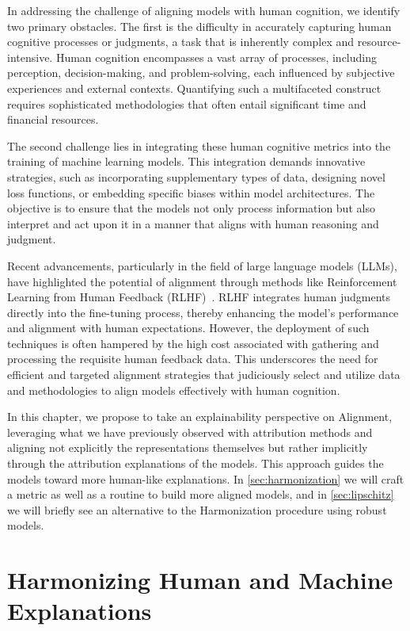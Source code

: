 In addressing the challenge of aligning models with human cognition, we identify two primary obstacles. The first is the difficulty in accurately capturing human cognitive processes or judgments, a task that is inherently complex and resource-intensive. Human cognition encompasses a vast array of processes, including perception, decision-making, and problem-solving, each influenced by subjective experiences and external contexts. Quantifying such a multifaceted construct requires sophisticated methodologies that often entail significant time and financial resources.

The second challenge lies in integrating these human cognitive metrics into the training of machine learning models. This integration demands innovative strategies, such as incorporating supplementary types of data, designing novel loss functions, or embedding specific biases within model architectures. The objective is to ensure that the models not only process information but also interpret and act upon it in a manner that aligns with human reasoning and judgment.

Recent advancements, particularly in the field of large language models (LLMs), have highlighted the potential of alignment through methods like Reinforcement Learning from Human Feedback (RLHF)~\cite{ouyang2022training}. RLHF integrates human judgments directly into the fine-tuning process, thereby enhancing the model's performance and alignment with human expectations. However, the deployment of such techniques is often hampered by the high cost associated with gathering and processing the requisite human feedback data. This underscores the need for efficient and targeted alignment strategies that judiciously select and utilize data and methodologies to align models effectively with human cognition.

In this chapter, we propose to take an explainability perspective on Alignment, leveraging what we have previously observed with attribution methods and aligning not explicitly the representations themselves but rather implicitly through the attribution explanations of the models. This approach guides the models toward more human-like explanations. In \autoref{sec:harmonization} we will craft a metric as well as a routine to build more aligned models, and in \autoref{sec:lipschitz} we will briefly see an alternative to the Harmonization procedure using robust models.

\clearpage

\section{Harmonizing Human and Machine Explanations}
\label{sec:harmonization}

\clearpage

